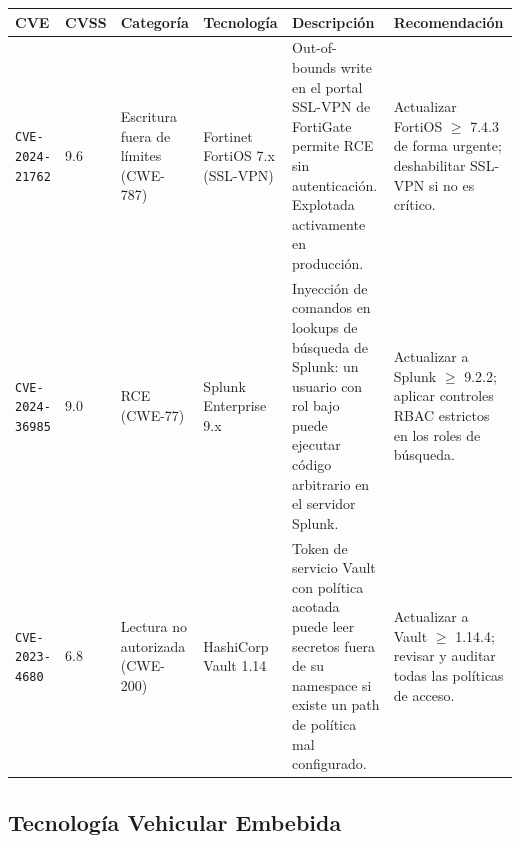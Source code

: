 \documentclass[letterpaper,11pt]{article}
\begin{document}
\begingroup\footnotesize
{}
\begin{tabular}{|p{2.3cm}|p{0.65cm}|p{1.9cm}|p{2.0cm}|p{3.9cm}|p{3.0cm}|}
\hline
\rowcolor{red!18}
\textbf{CVE} & \textbf{CVSS} & \textbf{Categoría} & \textbf{Tecnología} & \textbf{Descripción} & \textbf{Recomendación} \\
\hline
\texttt{CVE-2024-21762} & 9.6 & Escritura fuera de límites (CWE-787) & Fortinet FortiOS 7.x (SSL-VPN) & Out-of-bounds write en el portal SSL-VPN de FortiGate permite RCE sin autenticación. Explotada activamente en producción. & Actualizar FortiOS $\geq$ 7.4.3 de forma urgente; deshabilitar SSL-VPN si no es crítico. \\
\hline
\texttt{CVE-2024-36985} & 9.0 & RCE (CWE-77) & Splunk Enterprise 9.x & Inyección de comandos en lookups de búsqueda de Splunk: un usuario con rol bajo puede ejecutar código arbitrario en el servidor Splunk. & Actualizar a Splunk $\geq$ 9.2.2; aplicar controles RBAC estrictos en los roles de búsqueda. \\
\hline
\texttt{CVE-2023-4680} & 6.8 & Lectura no autorizada (CWE-200) & HashiCorp Vault 1.14 & Token de servicio Vault con política acotada puede leer secretos fuera de su namespace si existe un path de política mal configurado. & Actualizar a Vault $\geq$ 1.14.4; revisar y auditar todas las políticas de acceso. \\
\hline
\end{tabular}
\endgroup

\subsection{Tecnología Vehicular Embebida}
\end{document}
